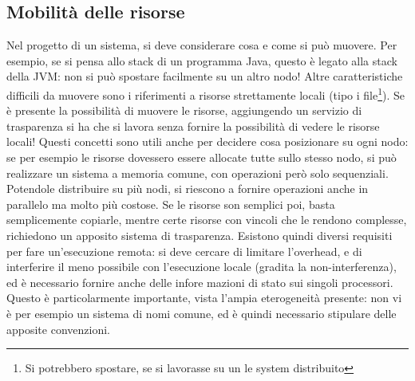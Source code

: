 \subsection{Mobilità delle risorse}
Nel progetto di un sistema, si deve considerare cosa e come si può muovere. Per esempio, se si pensa allo stack di un
programma Java, questo è legato alla stack della JVM: non si può spostare facilmente su un altro nodo! Altre
caratteristiche difficili da muovere sono i riferimenti a risorse strettamente locali (tipo i file\footnote{Si
potrebbero spostare, se si lavorasse su un le system distribuito}).
Se è presente la possibilità di muovere le risorse, aggiungendo un servizio di trasparenza si ha che si lavora senza
fornire la possibilità di vedere le risorse locali!
Questi concetti sono utili anche per decidere cosa posizionare su ogni nodo: se per esempio le risorse dovessero essere
allocate tutte sullo stesso nodo, si può realizzare un sistema a memoria comune, con operazioni però solo sequenziali.
Potendole distribuire su più nodi, si riescono a fornire operazioni anche in parallelo ma molto più costose. Se le
risorse son semplici poi, basta semplicemente copiarle, mentre certe risorse con vincoli che le rendono complesse,
richiedono un apposito sistema di trasparenza.
Esistono quindi diversi requisiti per fare un'esecuzione remota: si deve cercare di limitare l'overhead, e di
interferire il meno possibile con l'esecuzione locale (gradita la non-interferenza), ed è necessario fornire anche delle
infore mazioni di stato sui singoli processori. Questo è particolarmente importante, vista l'ampia eterogeneità
presente: non vi è per esempio un sistema di nomi comune, ed è quindi necessario stipulare delle apposite convenzioni.

